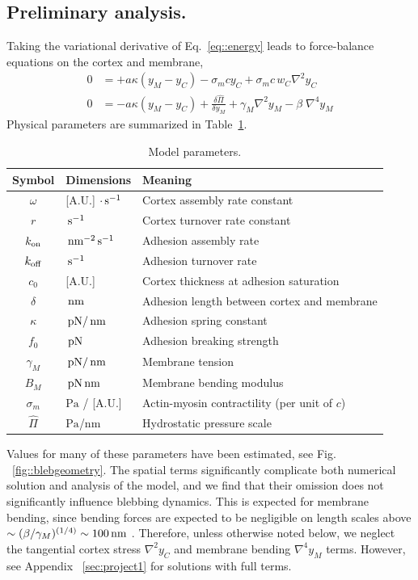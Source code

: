 \subsection{Preliminary analysis.}
Taking the variational derivative of Eq.~\ref{eq::energy} leads to force-balance equations on the cortex and membrane,
\begin{align}
0 &= + a \kappa (y_M-y_C) - \sigma_m c y_C + \sigma_m c\, w_C \nabla^2  y_C \label{eq::forceBalanceCortex}\\
0 &= - a\kappa (y_M-y_C) + \frac{\delta \hat{\Pi}}{\delta y_M}  + \gamma_M \nabla^2  y_M - \beta\;\nabla^4 y_M \label{eq::forceBalanceMembrane}
\end{align}
Physical parameters are summarized in Table~\ref{tab:modelparameters}. 
\begin{table}[t!]
\caption{Model parameters.}\centering \label{tab:modelparameters} 
\begin{tabular}{ c  l  l}
\hline
Symbol & Dimensions & Meaning \\
\hline
$\omega$ & [A.U.] $\cdot \,\mbox{s}^{-1}$ & Cortex assembly rate constant  \\
$r$ & $\,\mbox{s}^{-1} $ & Cortex turnover rate constant \\
$k_{\mbox{\scriptsize on}}$ & $\,\mbox{nm}^{-2}\,\mbox{s}^{-1}$ & Adhesion assembly rate  \\
$k_{\mbox{\scriptsize off}} $& $ \,\mbox{s}^{-1}$ & Adhesion turnover rate \\
$c_0$ & [A.U.] & Cortex thickness at adhesion saturation \\
$\delta$ &  $\,\mbox{nm}$& Adhesion length between cortex and membrane \\
$\kappa$ & $\,\mbox{pN}/\,\mbox{nm}$ & Adhesion spring constant \\
$f_0$ & $\,\mbox{pN}$ &Adhesion breaking strength\\
$\gamma_M$ & $ \,\mbox{pN}/\,\mbox{nm}$ & Membrane tension \\
$B_M$& $\,\mbox{pN}\,\mbox{nm}$ & Membrane bending modulus \\
$\sigma_m$ & $ \mbox{Pa}$ / [A.U.] & Actin-myosin contractility (per unit of $c$) \\
$\hat\Pi$ & $ \mbox{Pa}$/nm & Hydrostatic pressure scale \\
\hline
\end{tabular}
\end{table}
Values for many of these parameters have been estimated, see Fig. ~\ref{fig::blebgeometry}. The spatial terms significantly complicate both numerical solution and analysis of the model, and we find that their omission does not significantly influence blebbing dynamics. This is expected for membrane bending, since bending forces are expected to be negligible on length scales above $\sim (\beta/\gamma_M)^{(1/4)}\sim100\,\mbox{nm}$ \cite{Allard:2012gy}. Therefore, unless otherwise noted below, we neglect the tangential cortex stress $\nabla^2y_C$ and membrane bending $\nabla^4 y_M$ terms. However, see Appendix ~\ref{sec:project1} for solutions with full terms. 

